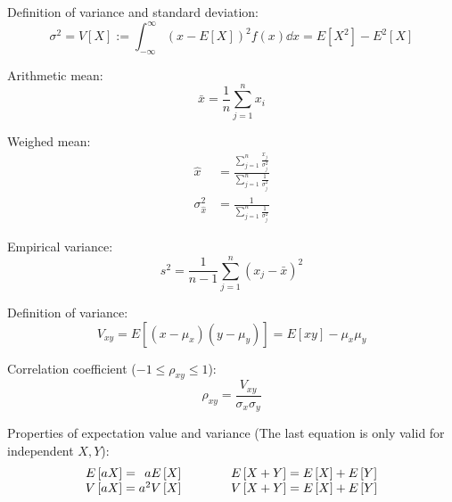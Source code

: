 			\noindent
			Definition of variance and standard deviation:
			\begin{equation}
				\sigma^2 = V\left[ X \right] := \int_{-\infty}^{\infty} (x-E\left[X\right])^2f(x)\dd{x} = E\left[X^2\right]-E^2\left[X\right]
			\end{equation}

			\noindent
			Arithmetic mean:
			\begin{equation}
				\bar{x}=\frac{1}{n}\sum_{j=1}^n x_i
			\end{equation}

			\noindent
			Weighed mean:
			\begin{equation}
				\begin{aligned}
					\hat{x} &= \frac{\sum_{j=1}^n \frac{x_j}{\sigma_j^2}}{\sum_{j=1}^n \frac{1}{\sigma_j^2}} \\
					\sigma_{\hat{x}}^2 &= \frac{1}{\sum_{j=1}^n \frac{1}{\sigma_j^2}}
				\end{aligned}
			\end{equation}

			\noindent
			Empirical variance:
			\begin{equation}
				s^2 = \frac{1}{n-1}\sum_{j=1}^n (x_j-\bar{x})^2
			\end{equation}

			\noindent
			Definition of variance:
			\begin{equation}
				V_{xy} = E\left[(x-\mu_x)(y-\mu_y)\right] = E\left[xy\right]-\mu_x\mu_y
			\end{equation}

			\noindent
			Correlation coefficient ($-1\le\rho_{xy}\le 1$):
			\begin{equation}
				\rho_{xy} = \frac{V_{xy}}{\sigma_x\sigma_y}
			\end{equation}

			\noindent
			Properties of expectation value and variance (The last equation is only valid for independent $X, Y$):
			\begin{equation}
				\begin{array}{rl}
					E\left[aX\right] = \phantom{^2}a E\left[X\right]
					& \hspace{30pt}
					E\left[X+Y\right] = E\left[X\right] + E\left[Y\right]
					\\
					V\left[aX\right] = a^2 V\left[X\right]
					& \hspace{30pt}
					V\left[X+Y\right] = E\left[X\right] + E\left[Y\right]
					\\
				\end{array}
			\end{equation}

